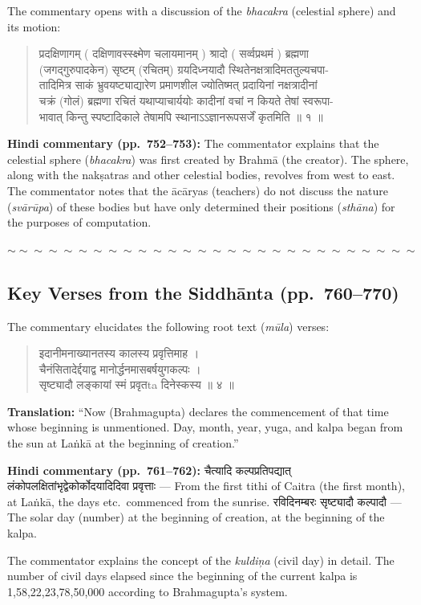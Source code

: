 \documentclass[11pt,a4paper]{article}
\newcommand{\dev}[1]{{\devanagarifont #1}}
\newenvironment{shloka}
  {\begin{verse}\devanagarifont\color{versecolor}}
  {\end{verse}}
\newenvironment{commentary}
  {\small\color{commentarycolor}\par\noindent\ignorespaces}
  {\par}
\newcommand{\wavydivider}{\begin{center}$\sim\sim\sim\sim\sim\sim\sim\sim\sim\sim\sim\sim\sim\sim\sim\sim\sim\sim\sim\sim\sim\sim\sim\sim\sim\sim\sim\sim$\end{center}}
\begin{document}
The commentary opens with a discussion of the \textit{bhacakra} (celestial sphere) and its motion:

\begin{shloka}
\dev{प्रदक्षिणागम् ( दक्षिणावस्स्क्ष्मेण चलायमानम् ) श्रादो ( सर्व्वप्रथमं ) ब्रह्मणा}\\
\dev{(जगद्गुरुपादकेन) सृष्टम् (रचितम्) ग्रयदिध्नयादौ स्थितेनक्षत्रादिमततुल्यचपा-}\\
\dev{तादिमित्र साकं भ्रुवयष्ट्याद्यारेण प्रमाणशील ज्योतिष्मत् प्रदायिनां नक्षत्रादीनां}\\
\dev{चक्रं (गोलं) ब्रह्मणा रचितं यथाप्याचार्ययोः कादीनां वचां न कियते तेषां स्वरूपा-}\\
\dev{भावात् किन्तु स्पष्टादिकाले तेषामपि स्थानाऽऽज्ञानरूपसर्जें कृतमिति ॥ १ ॥}
\end{shloka}

\begin{commentary}
\textbf{Hindi commentary (pp.\ 752--753):} The commentator explains that the celestial sphere (\textit{bhacakra}) was first created by Brahmā (the creator). The sphere, along with the nakṣatras and other celestial bodies, revolves from west to east. The commentator notes that the ācāryas (teachers) do not discuss the nature (\textit{svārūpa}) of these bodies but have only determined their positions (\textit{sthāna}) for the purposes of computation.
\end{commentary}

\wavydivider

\subsection*{Key Verses from the Siddhānta (pp.\ 760--770)}

The commentary elucidates the following root text (\textit{mūla}) verses:

\begin{shloka}
\dev{इदानीमनाख्यानतस्य कालस्य प्रवृत्तिमाह ।}\\
\dev{चैनंसितादेर्द्दयाद्व मानोर्द्धनमासबर्षयुगकल्पः ।}\\
\dev{सृष्ट्यादौ लङ्कायां स्मं प्रवृतta दिनेस्कस्य ॥ ४ ॥}
\end{shloka}

\textbf{Translation:} ``Now (Brahmagupta) declares the commencement of that time whose beginning is unmentioned. Day, month, year, yuga, and kalpa began from the sun at Laṅkā at the beginning of creation.''

\begin{commentary}
\textbf{Hindi commentary (pp.\ 761--762):} \dev{चैत्यादि कल्पप्रतिपद्यात् लंकोपलक्षितांभृद्वेकोर्कोदयादिदिवा प्रवृत्ताः} --- From the first tithi of Caitra (the first month), at Laṅkā, the days etc.\ commenced from the sunrise. \dev{रविदिनम्बरः सृष्ट्यादौ कल्पादौ} --- The solar day (number) at the beginning of creation, at the beginning of the kalpa.

The commentator explains the concept of the \textit{kuldiņa} (civil day) in detail. The number of civil days elapsed since the beginning of the current kalpa is 1,58,22,23,78,50,000 according to Brahmagupta's system.
\end{commentary}
\end{document}
